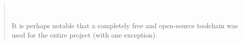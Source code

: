\documentclass[paper.tex]{subfiles}
\begin{document}
\begin{quotation}
\begin{itemize}
\end{itemize}\


\tableofcontents


It is perhaps notable that a completely free and open-source toolchain was used for the entire project (with one exception).

\end{quotation}
\end{document}
